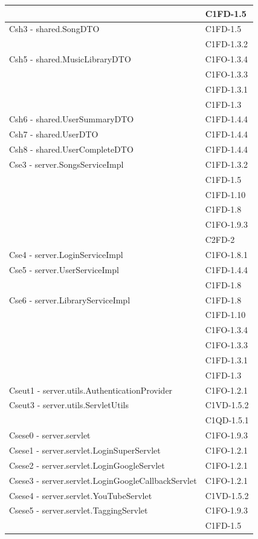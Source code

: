 \begin{footnotesize}
\begin{longtable}[!h]{|l|l|}
& C1FD-1.5 \\\hline
Csh3 - shared.SongDTO & C1FD-1.5 \\
& C1FD-1.3.2 \\\hline
Csh5 - shared.MusicLibraryDTO & C1FO-1.3.4 \\
& C1FO-1.3.3 \\
& C1FD-1.3.1 \\
& C1FD-1.3 \\\hline
Csh6 - shared.UserSummaryDTO & C1FD-1.4.4 \\\hline
Csh7 - shared.UserDTO & C1FD-1.4.4 \\\hline
Csh8 - shared.UserCompleteDTO & C1FD-1.4.4 \\\hline
Cse3 - server.SongsServiceImpl & C1FD-1.3.2 \\
& C1FD-1.5 \\
& C1FD-1.10 \\
& C1FD-1.8 \\
& C1FO-1.9.3 \\
& C2FD-2 \\\hline
Cse4 - server.LoginServiceImpl & C1FO-1.8.1 \\\hline
Cse5 - server.UserServiceImpl & C1FD-1.4.4 \\
& C1FD-1.8 \\\hline
Cse6 - server.LibraryServiceImpl & C1FD-1.8 \\
& C1FD-1.10 \\
& C1FO-1.3.4 \\
& C1FO-1.3.3 \\
& C1FD-1.3.1 \\
& C1FD-1.3 \\\hline
Cseut1 - server.utils.AuthenticationProvider & C1FO-1.2.1 \\\hline
Cseut3 - server.utils.ServletUtils & C1VD-1.5.2 \\
& C1QD-1.5.1 \\\hline
Csese0 - server.servlet & C1FO-1.9.3 \\\hline
Csese1 - server.servlet.LoginSuperServlet &  C1FO-1.2.1 \\\hline
Csese2 - server.servlet.LoginGoogleServlet & C1FO-1.2.1 \\\hline
Csese3 - server.servlet.LoginGoogleCallbackServlet & C1FO-1.2.1 \\\hline
Csese4 - server.servlet.YouTubeServlet & C1VD-1.5.2 \\\hline
Csese5 - server.servlet.TaggingServlet & C1FO-1.9.3 \\
& C1FD-1.5 \\\hline

\end{longtable}
\end{footnotesize}
